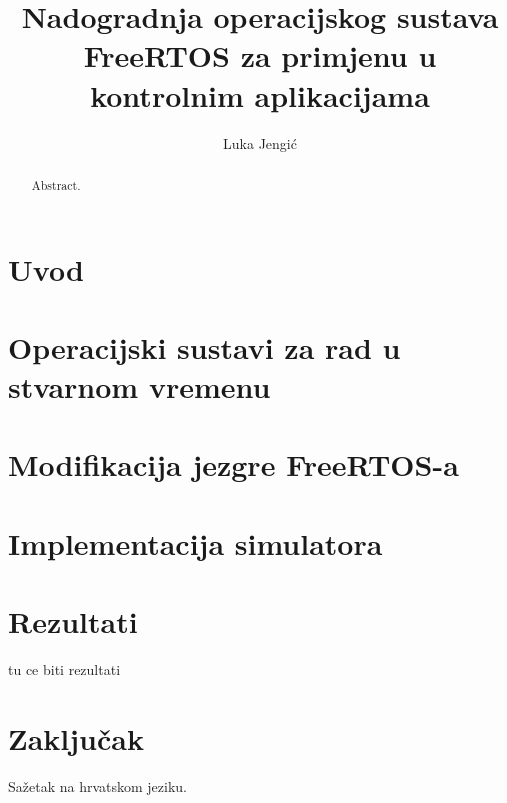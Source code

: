 \documentclass[times, utf8, zavrsni]{fer}
\begin{document}

\title{Nadogradnja operacijskog sustava FreeRTOS za primjenu u kontrolnim aplikacijama}

\author{Luka Jengić}

\maketitle

\izvornik

\zahvala{}

\renewcommand\contentsname{Sadržaj}
\tableofcontents

\chapter{Uvod} 


\chapter{Operacijski sustavi za rad u stvarnom vremenu}


\chapter{Modifikacija jezgre FreeRTOS-a}


\chapter{Implementacija simulatora}


\chapter{Rezultati}

tu ce biti rezultati

\chapter{Zaključak}





\begin{sazetak}
Sažetak na hrvatskom jeziku.

\end{sazetak}

\begin{abstract}
Abstract.

\end{abstract}
\end{document}
